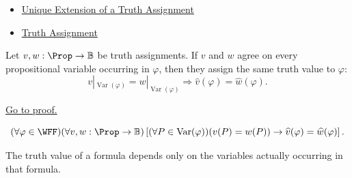 \begin{dependencies}
\begin{itemize}
  \item \hyperref[thm:unique-extension-truth-assignment-propositional-logic]{Unique Extension of a Truth Assignment}
  \item \hyperref[def:truth-assignment-propositional-logic]{Truth Assignment}
\end{itemize}
\end{dependencies}
\begin{tcolorbox}[colback=lembox, colframe=lemborder, arc=2pt,
  left=6pt, right=6pt, top=4pt, bottom=4pt,
  title={\small\textbf{Lemma (Coincidence Lemma for Propositional Logic)}},
  fonttitle=\small\bfseries]
\begin{lemma}
\label{lem:coincidence-lemma-propositional-logic}
Let \(v,w:\Prop\to\mathbb{B}\) be truth assignments. If \(v\) and \(w\) agree on every propositional variable occurring in \(\varphi\), then they assign the same truth value to \(\varphi\):
\[
v|_{\operatorname{Var}(\varphi)}
=
w|_{\operatorname{Var}(\varphi)}
\Longrightarrow
\widehat v(\varphi)=\widehat w(\varphi).
\]

\noindent\hyperref[prf:coincidence-lemma-propositional-logic]{Go to proof.}
\end{lemma}
\end{tcolorbox}

\begin{remark*}
\[
(\forall\varphi\in\WFF)
(\forall v,w:\Prop\to\mathbb{B})
\left[
(\forall P\in\operatorname{Var}(\varphi))(v(P)=w(P))
\to
\widehat v(\varphi)=\widehat w(\varphi)
\right].
\]
\end{remark*}

\begin{remark*}[Interpretation]
The truth value of a formula depends only on the variables actually occurring in that formula.
\end{remark*}

